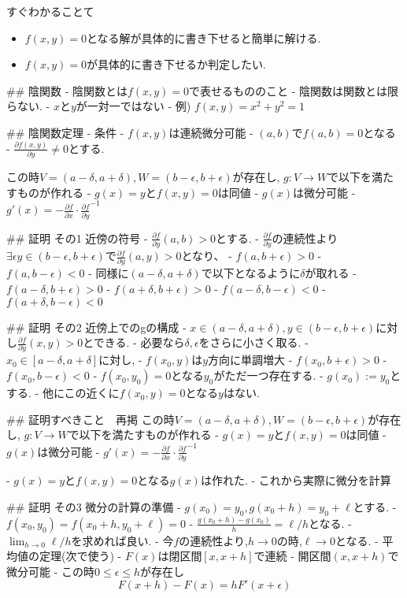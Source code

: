 \documentclass{ujarticle}
\begin{document}
すぐわかることて
\begin{itemize}
  \item $f(x, y) = 0$となる解が具体的に書き下せると簡単に解ける.
  \item  $f(x ,y) = 0$が具体的に書き下せるか判定したい.
\end{itemize}

## 陰関数
- 陰関数とは$f(x, y) = 0$で表せるもののこと
- 陰関数は関数とは限らない.
  - $x$と$y$が一対一ではない
- 例) $f(x , y) = x^2 + y^2 = 1$

## 陰関数定理
- 条件
  - $f(x ,y)$は連続微分可能
  - $(a, b)$で$f(a , b) = 0$となる
  - $\frac{\partial f(x, y)}{\partial y} \neq 0$とする.

この時$V = (a - \delta, a + \delta),W = (b - \epsilon , b + \epsilon)$が存在し,
$g:V \to W$で以下を満たすものが作れる
  - $g(x) = y$と$f(x, y) = 0$は同値
  - $g(x)$は微分可能
  - $g'(x) = - \frac{\partial f}{\partial x} \cdot \frac{\partial f}{\partial y}^{-1}$

## 証明 その1 近傍の符号
- $\frac{\partial f}{\partial y}(a, b) > 0$とする.
- $\frac{\partial f}{\partial y}$の連続性より$\exists  \epsilon y \in (b - \epsilon, b + \epsilon)$で$\frac{\partial f}{\partial y}(a, y) > 0$となり、
  - $f(a, b + \epsilon) > 0$
  - $f(a, b - \epsilon) < 0$
- 同様に$(a - \delta, a + \delta)$で以下となるように$\delta$が取れる
  - $f(a - \delta, b + \epsilon) > 0$
  - $f(a + \delta, b + \epsilon) > 0$
  - $f(a - \delta, b - \epsilon) < 0$
  - $f(a + \delta, b - \epsilon) < 0$

## 証明 その2 近傍上でのgの構成
- $x \in (a - \delta, a + \delta), y \in (b - \epsilon, b + \epsilon)$に対し$\frac{\partial f}{\partial y}(x, y) > 0$とできる.
  - 必要なら$\delta, \epsilon$をさらに小さく取る.
- $x_0 \in [a - \delta, a + \delta]$に対し,
  - $f(x_0, y)$は$y$方向に単調増大
  - $f(x_0, b + \epsilon) > 0$
  - $f(x_0, b - \epsilon) < 0$
- $f(x_0, y_0) = 0$となる$y_0$がただ一つ存在する.
- $g(x_0):= y_0$とする.
- 他にこの近くに$f(x_0, y) = 0$となる$y$はない.

## 証明すべきこと　再掲
この時$V = (a - \delta, a + \delta),W = (b - \epsilon , b + \epsilon)$が存在し,
$g:V \to W$で以下を満たすものが作れる
  - $g(x) = y$と$f(x, y) = 0$は同値
  - $g(x)$は微分可能
  - $g'(x) = - \frac{\partial f}{\partial x} \cdot \frac{\partial f}{\partial y}^{-1}$

- $g(x) = y$と$f(x, y) = 0$となる$g(x)$は作れた.
- これから実際に微分を計算

## 証明 その3 微分の計算の準備
- $g(x_0) = y_0, g(x_0 + h) = y_0 + \ell$とする.
  - $f(x_0, y_0) = f(x_0 + h, y_0 + \ell) = 0$
- $\frac{g(x_0 + h) - g(x_0)}{h} = \ell / h$となる.
- $\lim_{h \to 0} \ell / h$を求めれば良い.
- 今$f$の連続性より,$h \to 0$の時,$\ell \to 0$となる.
- 平均値の定理(次で使う)
  - $F(x)$は閉区間$[x, x+h]$で連続
  - 開区間$(x, x + h)$で微分可能
  - この時$0 \le \epsilon \le h$が存在し
  $$F(x+h) - F(x) = hF'(x+ \epsilon)$$
\end{document}
